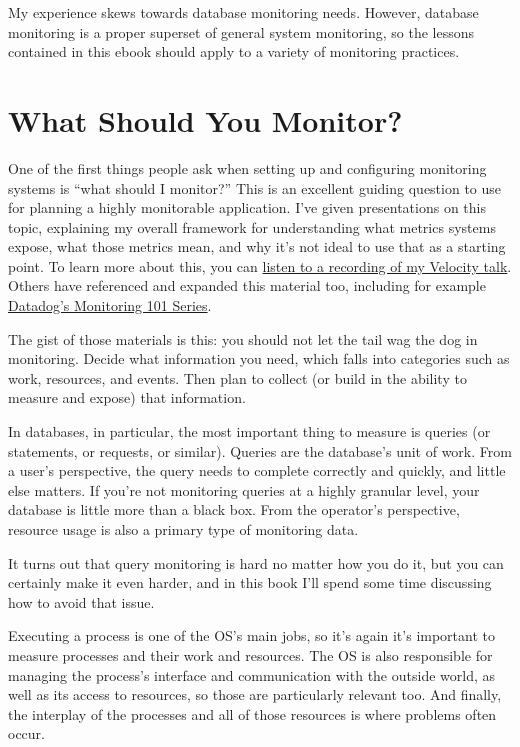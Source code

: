 \documentclass{vivid_layout}
\begin{document}
My experience skews towards database
monitoring needs. However, database monitoring 
is a proper superset of general system monitoring, so the lessons
contained in this ebook should apply to a variety of monitoring practices.

\newpage

\section{What Should You Monitor?}

One of the first things people ask when setting up and configuring
monitoring systems is ``what should I monitor?'' This is an excellent guiding
question to use for planning a highly monitorable application. I've given
presentations on this topic, explaining my overall framework for understanding
what metrics systems expose, what those metrics mean, and why it's not ideal
to use that as a starting point. To learn more about this, you can
\href{https://www.youtube.com/watch?v=zLjhFrUhqxg}{listen to a recording of my
Velocity talk}. 
Others have referenced and expanded this material too, including for example
\href{https://www.datadoghq.com/blog/monitoring-101-collecting-data/}{Datadog's
Monitoring 101 Series}.

The gist of those materials is this: you should not let the tail wag the dog in
monitoring. Decide what information you need, which falls into categories
such as work, resources, and events. Then plan to collect (or build
in the ability to measure and expose) that information.

In databases, in particular, the most important thing to measure is queries (or
statements, or requests, or similar).  Queries are the database's unit of work.
From a user's perspective, the query needs to complete correctly and quickly,
and little else matters.  If you're not monitoring queries at a highly granular
level, your database is little more than a black box.  From the operator's perspective,
resource usage is also a primary type of monitoring data.

It turns out that query monitoring is hard no matter how you do it, but you can
certainly make it even harder, and in this book I'll
spend some time discussing how to avoid that issue.

Executing a process is one of the OS's main jobs, so it's
again it's important to measure processes and their work and
resources. The OS is also responsible for managing the process's
interface and communication with the outside world, as well as its access to
resources, so those are particularly relevant too. And finally, the interplay
of the processes and all of those resources is where problems often occur.
\end{document}
